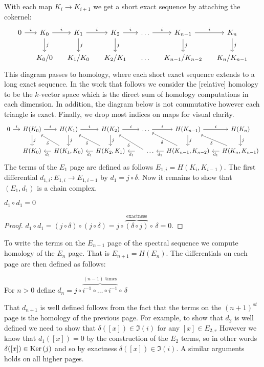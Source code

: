 \noindent With each map $K_i \rightarrow K_{i+1}$ we get a short exact sequence by attaching the cokernel:
\[
\begin{tikzcd} [column sep=small]
0 \arrow{r}{i} & \K_0 \arrow{r}{i}\arrow{d}{j} & \K_1 \arrow{r}{i}\arrow{d}{j}   & \K_2 \arrow{r}{i}\arrow{d}{j} & \ldots \arrow{r}{i} & \K_{n-1} \arrow{r}{i} \arrow{d}{j} & \K_n\arrow{d}{j} \\ 		&     \K_0/{0} &			 \K_1/{\K_0} & 	 \K_2/{\K_{1}}		   & \ldots  			   & \K_{n-1}/{\K_{n-2}}		 & \K_n/{\K_{n-1}} 
\end{tikzcd}
\]
This diagram passes to homology, where each short exact sequence extends to a long exact sequence. In the work that follows we consider the [relative] homology to be the $k$-vector space which is the direct sum of homology computations in each dimension. In addition, the diagram below is not commutative however each triangle is exact. Finally, we drop most indices on maps for visual clarity.
\[
\begin{tikzcd}[column sep=small]
0 \arrow{r}{i} & H(\K_0 \arrow{r}{i}\arrow{d}{j}) & H(\K_1 \arrow{r}{i}\arrow{d}{j})   & H(\K_2 \arrow{r}{i}\arrow{d}{j}) & \ldots \arrow{r}{i} & H(\K_{n-1}) \arrow{r}{i} \arrow{d}{j} & H(\K_n\arrow{d}{j}) \\ 		
&     H(\K_0) &			\arrow{l}{d_{1}} \arrow{ul}{\delta}  H(\K_1, {\K_0}) & 	\arrow{l}{d_{1}} \arrow{ul}{\delta} H(\K_2, {\K_{1}})		   & \arrow{l}{d_{1}} \arrow{ul}{\delta} \hspace{.5cm} \ldots  			   &\arrow{l}{d_{1}}\arrow{ul}{\delta}H(\K_{n-1}, {\K_{n-2}})		 & \arrow{l}{d_{1}} \arrow{ul}{\delta} H(\K_n, {\K_{n-1}})
\end{tikzcd}
\]
The terms of the $E_1$ page are defined as follows $E_{1,i} = H(K_i, K_{i-1})$.  The first differential $d_{1,i}: E_{1,i} \rightarrow E_{1,{i-1}}$ by $d_1 = j \circ \delta$. Now it remains to show that $(E_1, d_1)$ is a chain complex.
\begin{lemma} $d_1 \circ d_1 = 0$ \end{lemma} 
\begin{proof}
$d_1 \circ d_1 = (j \circ \delta) \circ (j \circ \delta) = j \circ \overbrace{(\delta \circ j)}^{\textrm{exactness}} \circ\, \delta = 0.$
\end{proof}
To write the terms on the $E_{n+1}$ page of the spectral sequence we compute homology of the $E_{n}$ page. 
That is $E_{n+1} = H(E_n)$. 
The differentials on each page are then defined as follows:
\begin{definition} For $n > 0$ define $d_n = j \circ \overbrace{i^{-1} \circ \ldots \circ i^{-1}}^{(n-1)\textrm{ times}} \circ\, \delta$
\end{definition}
That $d_{n+1}$ is well defined follows from the fact that the terms on the $(n+1)^{st}$ page is the homology of the previous page. For example, to show that $d_2$ is well defined we need to show that $\delta([x]) \in \Im(i)$ for any $[x] \in E_{2,r}$ However we know that $d_1([x]) = 0$ by the construction of the $E_2$ terms, so in other words $\delta([x]) \in \operatorname{Ker}{(j)}$ and so by exactness $\delta([x]) \in \Im(i)$. A similar arguments holds on all higher pages.

